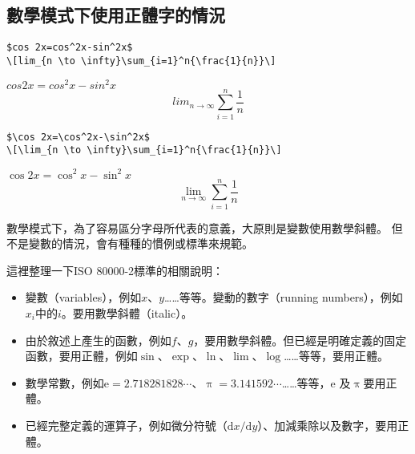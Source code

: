 \subsection{數學模式下使用正體字的情況}

\begin{Wrong}
\begin{verbatim}
$cos 2x=cos^2x-sin^2x$
\[lim_{n \to \infty}\sum_{i=1}^n{\frac{1}{n}}\]
\end{verbatim}
$cos 2x=cos^2x-sin^2x$
\[lim_{n \to \infty}\sum_{i=1}^n{\frac{1}{n}}\]
\end{Wrong}

\begin{Right}
\begin{verbatim}
$\cos 2x=\cos^2x-\sin^2x$
\[\lim_{n \to \infty}\sum_{i=1}^n{\frac{1}{n}}\]
\end{verbatim}
$\cos 2x=\cos^2x-\sin^2x$
\[\lim_{n \to \infty}\sum_{i=1}^n{\frac{1}{n}}\]
\end{Right}

數學模式下，為了容易區分字母所代表的意義，大原則是變數使用數學斜體。
但不是變數的情況，會有種種的慣例或標準來規範。

這裡整理一下{\sf ISO 80000-2}標準的相關說明：

\begin{itemize}
\item 變數（variables），例如$x$、$y$……等等。變動的數字（running numbers），例如$x_i$中的$i$。要用數學斜體（italic）。
\item 由於敘述上產生的函數，例如$f$、$g$，要用數學斜體。但已經是明確定義的固定函數，要用正體，例如$\sin$、$\exp$、$\ln$、$\lim$、$\log$……等等，要用正體。
\item 數學常數，例如$\text{e}=\num{2.718281828}\cdots$、$\uppi=\num{3.141592}\cdots$……等等，e 及$\uppi$要用正體。
\item 已經完整定義的運算子，例如微分符號（$\text{d}x/\text{d}y$）、加減乘除以及數字，要用正體。
\end{itemize}

\marginpar{\back}

